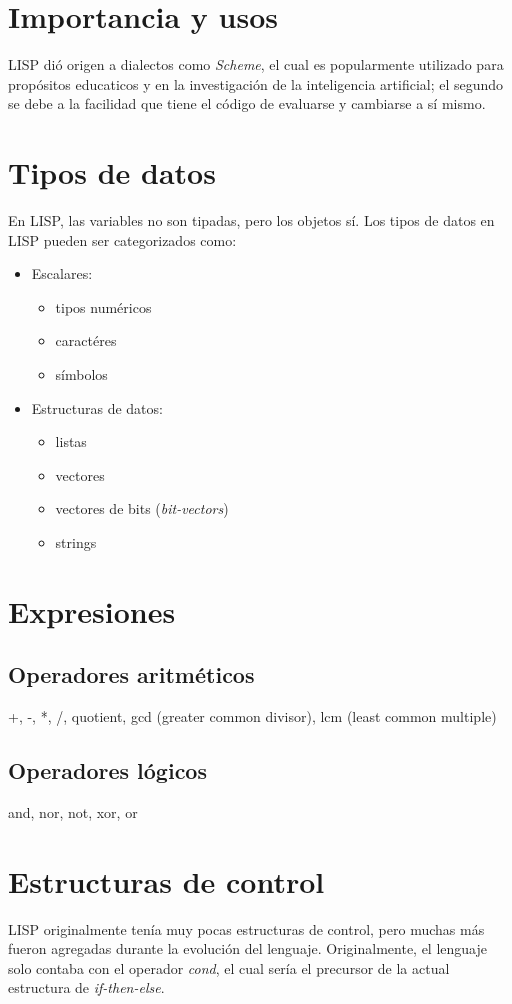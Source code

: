 \documentclass{IEEEtran}
\begin{document}
\section{Importancia y usos}
LISP di\'o origen a dialectos como \emph{Scheme}, el cual es popularmente utilizado para prop\'ositos educaticos y en la investigaci\'on de la inteligencia artificial; el segundo se debe a la facilidad que tiene el c\'odigo de evaluarse y cambiarse a s\'i mismo.

\section{Tipos de datos}
En LISP, las variables no son tipadas, pero los objetos s\'i.
Los tipos de datos en LISP pueden ser categorizados como:
\begin{itemize}
  \item Escalares:
  \begin{itemize}
    \item tipos num\'ericos
    \item caract\'eres
    \item s\'imbolos
  \end{itemize}
  \item Estructuras de datos:
  \begin{itemize}
    \item listas
    \item vectores
    \item vectores de bits (\emph{bit-vectors})
    \item strings
  \end{itemize}
\end{itemize}

\section{Expresiones}
\subsection{Operadores aritm\'eticos}
+, -, *, /, quotient, gcd (greater common divisor), lcm (least common multiple)

\subsection{Operadores l\'ogicos}
and, nor, not, xor, or

\section{Estructuras de control}
LISP originalmente ten\'ia muy pocas estructuras de control, pero muchas m\'as fueron agregadas durante la evoluci\'on del lenguaje. Originalmente, el lenguaje solo contaba con el operador \emph{cond}, el cual ser\'ia el precursor de la actual estructura de \emph{if-then-else}.
\end{document}
